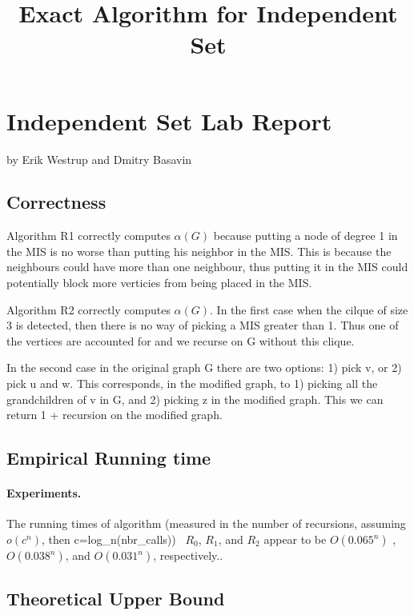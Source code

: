 \documentclass{tufte-handout}
\title{\sf Exact Algorithm for Independent Set}
\author{}
\begin{document}
\maketitle

\section{Independent Set Lab Report}
by Erik Westrup and Dmitry Basavin

\subsection{Correctness}
Algorithm R1 correctly computes $\alpha(G)$ because putting a node of degree 1 in the MIS is no worse than putting his neighbor in the MIS. This is because the neighbours could have more than one neighbour, thus putting it in the MIS could potentially block more verticies from being placed in the MIS.

\noindent
Algorithm R2 correctly computes $\alpha(G)$. In the first case when the cilque of size 3 is detected, then there is no way of picking a MIS greater than 1. Thus one of the vertices are accounted for and we recurse on G without this clique.

In the second case in the original graph G there are two options: 1) pick v, or 2) pick u and w. This corresponds, in the modified graph, to 1) picking all the grandchildren of v in G, and  2) picking z in the modified graph. This we can return 1 + recursion on the modified graph.

\subsection{Empirical Running time}

\paragraph{Experiments.}

\medskip
\noindent

    

The running times of algorithm (measured in the number of recursions, assuming $o(c^n)$, then c=log\_n(nbr\_calls)) ~$R_0$, $R_1$, and $R_2$ appear to be
$O(0.065^n)$ , $O(0.038^n)$, and $O(0.031^n)$, respectively..

\subsection{Theoretical Upper Bound}
\end{document}
